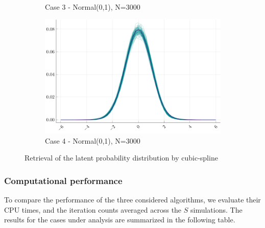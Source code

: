 \begin{figure}[H]
\begin{subfigure}[t]{.4\textwidth}
		\caption{Case 3 - Normal(0,1), N=3000} 
		\centering
	\end{subfigure}
	\vspace{20px}
	\begin{subfigure}[t]{.4\textwidth}
		\centering
		\includegraphics[width=\linewidth]{Figures/4/W.pdf}
		\caption{Case 4 - Normal(0,1), N=3000} 
		
	\end{subfigure}
	\caption{Retrieval of the latent probability distribution by cubic-spline}
	\label{fig:cubicspline}
\end{figure}


\subsubsection{Computational performance}


To compare the performance of the three considered algorithms, we evaluate their CPU times, and the iteration counts averaged across the $S$ simulations. The results for the cases under analysis are summarized in the following table.

